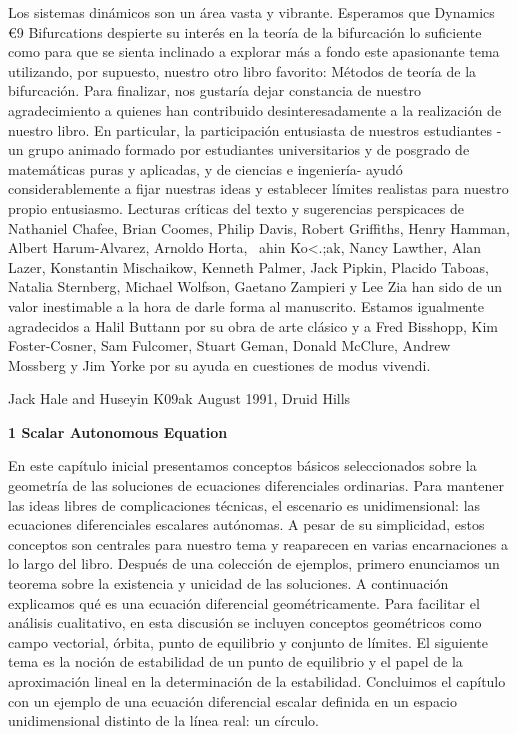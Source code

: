 \documentclass[]{article}
\begin{document}
\hfill

Los sistemas dinámicos son un área vasta y vibrante. Esperamos que Dynamics €9 Bifurcations despierte su interés en la teoría de la bifurcación lo suficiente como para que se sienta inclinado a explorar más a fondo este apasionante tema utilizando, por supuesto, nuestro otro libro favorito: Métodos de teoría de la bifurcación. Para finalizar, nos gustaría dejar constancia de nuestro agradecimiento a quienes han contribuido desinteresadamente a la realización de nuestro libro. En particular, la participación entusiasta de nuestros estudiantes -un grupo animado formado por estudiantes universitarios y de posgrado de matemáticas puras y aplicadas, y de ciencias e ingeniería- ayudó considerablemente a fijar nuestras ideas y establecer límites realistas para nuestro propio entusiasmo. Lecturas críticas del texto y sugerencias perspicaces de Nathaniel Chafee, Brian Coomes, Philip Davis, Robert Griffiths, Henry Hamman, Albert Harum-Alvarez, Arnoldo Horta, ~ahin Ko<.;ak, Nancy Lawther, Alan Lazer, Konstantin Mischaikow, Kenneth Palmer, Jack Pipkin, Placido Taboas, Natalia Sternberg, Michael Wolfson, Gaetano Zampieri y Lee Zia han sido de un valor inestimable a la hora de darle forma al manuscrito. Estamos igualmente agradecidos a Halil Buttann por su obra de arte clásico y a Fred Bisshopp, Kim Foster-Cosner, Sam Fulcomer, Stuart Geman, Donald McClure, Andrew Mossberg y Jim Yorke por su ayuda en cuestiones de modus vivendi.

\hfill

Jack Hale and Huseyin K09ak
August 1991, Druid Hills

\hfill

\textbf{1 Scalar Autonomous Equation}

\hfill

En este capítulo inicial presentamos conceptos básicos seleccionados sobre la geometría de las soluciones de ecuaciones diferenciales ordinarias. Para mantener las ideas libres de complicaciones técnicas, el escenario es unidimensional: las ecuaciones diferenciales escalares autónomas. A pesar de su simplicidad, estos conceptos son centrales para nuestro tema y reaparecen en varias encarnaciones a lo largo del libro. Después de una colección de ejemplos, primero enunciamos un teorema sobre la existencia y unicidad de las soluciones. A continuación explicamos qué es una ecuación diferencial geométricamente. Para facilitar el análisis cualitativo, en esta discusión se incluyen conceptos geométricos como campo vectorial, órbita, punto de equilibrio y conjunto de límites. El siguiente tema es la noción de estabilidad de un punto de equilibrio y el papel de la aproximación lineal en la determinación de la estabilidad. Concluimos el capítulo con un ejemplo de una ecuación diferencial escalar definida en un espacio unidimensional distinto de la línea real: un círculo.
\end{document}
